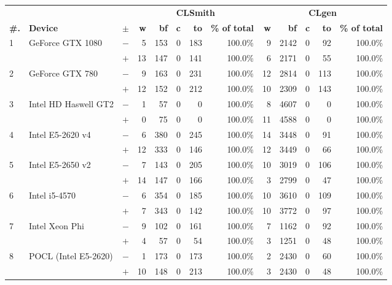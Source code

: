   \begin{tabular}{lll | rrrrr | rrrrr }
  \toprule
  & & & \multicolumn{5}{c|}{\textbf{CLSmith}} & \multicolumn{5}{c}{\textbf{CLgen}} \\
  \textbf{\#.} & \textbf{Device} & $\pm$ &
  \textbf{w} & \textbf{bf} & \textbf{c} & \textbf{to} & \textbf{\% of total} &
  \textbf{w} & \textbf{bf} & \textbf{c} & \textbf{to} & \textbf{\% of total} \\
  \midrule
  \multirow{ 2}{*}{1} & \multirow{ 2}{*}{GeForce GTX 1080} & $-$ & 5 & 153 & 0 & 183 & 100.0\%       & 9 & 2142 & 0 & 92 & 100.0\% \\& & $+$ & 13 & 147 & 0 & 141 & 100.0\% & 6 & 2171 & 0 & 55 & 100.0\% \\
\hline
\multirow{ 2}{*}{2} & \multirow{ 2}{*}{GeForce GTX 780} & $-$ & 9 & 163 & 0 & 231 & 100.0\%       & 12 & 2814 & 0 & 113 & 100.0\% \\& & $+$ & 12 & 152 & 0 & 212 & 100.0\% & 10 & 2309 & 0 & 143 & 100.0\% \\
\hline
\multirow{ 2}{*}{3} & \multirow{ 2}{*}{Intel HD Haswell GT2} & $-$ & 1 & 57 & 0 & 0 & 100.0\%       & 8 & 4607 & 0 & 0 & 100.0\% \\& & $+$ & 0 & 75 & 0 & 0 & 100.0\% & 11 & 4588 & 0 & 0 & 100.0\% \\
\hline
\multirow{ 2}{*}{4} & \multirow{ 2}{*}{Intel E5-2620 v4} & $-$ & 6 & 380 & 0 & 245 & 100.0\%       & 14 & 3448 & 0 & 91 & 100.0\% \\& & $+$ & 12 & 333 & 0 & 146 & 100.0\% & 12 & 3449 & 0 & 66 & 100.0\% \\
\hline
\multirow{ 2}{*}{5} & \multirow{ 2}{*}{Intel E5-2650 v2} & $-$ & 7 & 143 & 0 & 205 & 100.0\%       & 10 & 3019 & 0 & 106 & 100.0\% \\& & $+$ & 14 & 147 & 0 & 166 & 100.0\% & 3 & 2799 & 0 & 47 & 100.0\% \\
\hline
\multirow{ 2}{*}{6} & \multirow{ 2}{*}{Intel i5-4570} & $-$ & 6 & 354 & 0 & 185 & 100.0\%       & 10 & 3610 & 0 & 109 & 100.0\% \\& & $+$ & 7 & 343 & 0 & 142 & 100.0\% & 10 & 3772 & 0 & 97 & 100.0\% \\
\hline
\multirow{ 2}{*}{7} & \multirow{ 2}{*}{Intel Xeon Phi} & $-$ & 9 & 102 & 0 & 161 & 100.0\%       & 7 & 1162 & 0 & 92 & 100.0\% \\& & $+$ & 4 & 57 & 0 & 54 & 100.0\% & 3 & 1251 & 0 & 48 & 100.0\% \\
\hline
\multirow{ 2}{*}{8} & \multirow{ 2}{*}{POCL (Intel E5-2620)} & $-$ & 1 & 173 & 0 & 173 & 100.0\%       & 2 & 2430 & 0 & 60 & 100.0\% \\& & $+$ & 10 & 148 & 0 & 213 & 100.0\% & 3 & 2430 & 0 & 48 & 100.0\% \\

\end{tabular}
